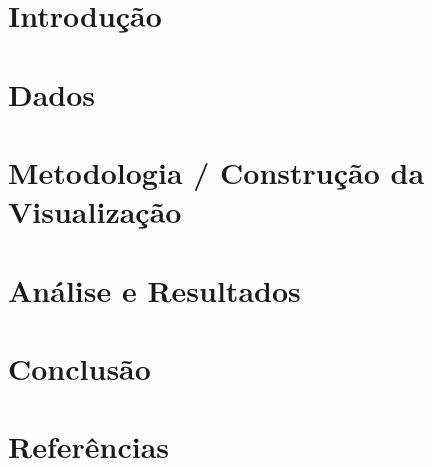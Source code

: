 \documentclass{article}
\begin{document}
\tableofcontents

\newpage


\section{Introdução}
\section{Dados}
\section{Metodologia / Construção da Visualização}
\section{Análise e Resultados}
\section{Conclusão}
\section{Referências}
\end{document}

